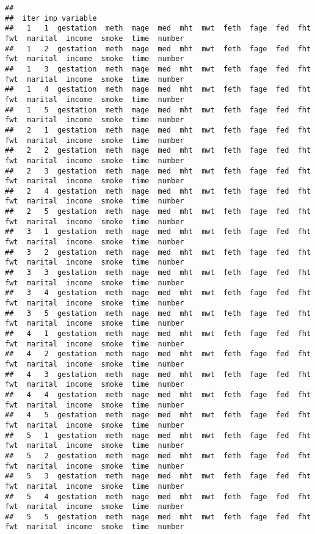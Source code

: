 \documentclass[]{article}
\begin{document}
\begin{verbatim}
## 
##  iter imp variable
##   1   1  gestation  meth  mage  med  mht  mwt  feth  fage  fed  fht  fwt  marital  income  smoke  time  number
##   1   2  gestation  meth  mage  med  mht  mwt  feth  fage  fed  fht  fwt  marital  income  smoke  time  number
##   1   3  gestation  meth  mage  med  mht  mwt  feth  fage  fed  fht  fwt  marital  income  smoke  time  number
##   1   4  gestation  meth  mage  med  mht  mwt  feth  fage  fed  fht  fwt  marital  income  smoke  time  number
##   1   5  gestation  meth  mage  med  mht  mwt  feth  fage  fed  fht  fwt  marital  income  smoke  time  number
##   2   1  gestation  meth  mage  med  mht  mwt  feth  fage  fed  fht  fwt  marital  income  smoke  time  number
##   2   2  gestation  meth  mage  med  mht  mwt  feth  fage  fed  fht  fwt  marital  income  smoke  time  number
##   2   3  gestation  meth  mage  med  mht  mwt  feth  fage  fed  fht  fwt  marital  income  smoke  time  number
##   2   4  gestation  meth  mage  med  mht  mwt  feth  fage  fed  fht  fwt  marital  income  smoke  time  number
##   2   5  gestation  meth  mage  med  mht  mwt  feth  fage  fed  fht  fwt  marital  income  smoke  time  number
##   3   1  gestation  meth  mage  med  mht  mwt  feth  fage  fed  fht  fwt  marital  income  smoke  time  number
##   3   2  gestation  meth  mage  med  mht  mwt  feth  fage  fed  fht  fwt  marital  income  smoke  time  number
##   3   3  gestation  meth  mage  med  mht  mwt  feth  fage  fed  fht  fwt  marital  income  smoke  time  number
##   3   4  gestation  meth  mage  med  mht  mwt  feth  fage  fed  fht  fwt  marital  income  smoke  time  number
##   3   5  gestation  meth  mage  med  mht  mwt  feth  fage  fed  fht  fwt  marital  income  smoke  time  number
##   4   1  gestation  meth  mage  med  mht  mwt  feth  fage  fed  fht  fwt  marital  income  smoke  time  number
##   4   2  gestation  meth  mage  med  mht  mwt  feth  fage  fed  fht  fwt  marital  income  smoke  time  number
##   4   3  gestation  meth  mage  med  mht  mwt  feth  fage  fed  fht  fwt  marital  income  smoke  time  number
##   4   4  gestation  meth  mage  med  mht  mwt  feth  fage  fed  fht  fwt  marital  income  smoke  time  number
##   4   5  gestation  meth  mage  med  mht  mwt  feth  fage  fed  fht  fwt  marital  income  smoke  time  number
##   5   1  gestation  meth  mage  med  mht  mwt  feth  fage  fed  fht  fwt  marital  income  smoke  time  number
##   5   2  gestation  meth  mage  med  mht  mwt  feth  fage  fed  fht  fwt  marital  income  smoke  time  number
##   5   3  gestation  meth  mage  med  mht  mwt  feth  fage  fed  fht  fwt  marital  income  smoke  time  number
##   5   4  gestation  meth  mage  med  mht  mwt  feth  fage  fed  fht  fwt  marital  income  smoke  time  number
##   5   5  gestation  meth  mage  med  mht  mwt  feth  fage  fed  fht  fwt  marital  income  smoke  time  number
\end{verbatim}
\end{document}
